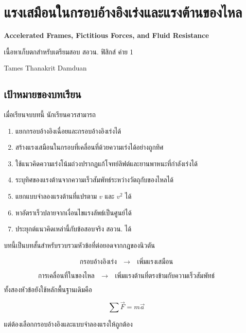 
\chapter{แรงเสมือนในกรอบอ้างอิงเร่งและแรงต้านของไหล}

\begin{center}
    {\Large\bfseries Accelerated Frames, Fictitious Forces, and Fluid Resistance}

    \vspace{0.5em}

    {\large เนื้อหาเก็บตกสำหรับเตรียมสอบ สอวน. ฟิสิกส์ ค่าย 1}

    \vspace{1em}

    Tames Thanakrit Damduan
\end{center}

\vspace{1em}

\section*{เป้าหมายของบทเรียน}

เมื่อเรียนจบบทนี้ นักเรียนควรสามารถ

\begin{enumerate}
    \item แยกกรอบอ้างอิงเฉื่อยและกรอบอ้างอิงเร่งได้
    \item สร้างแรงเสมือนในกรอบที่เคลื่อนที่ด้วยความเร่งได้อย่างถูกทิศ
    \item ใช้แนวคิดความเร่งโน้มถ่วงปรากฏแก้โจทย์ลิฟต์และยานพาหนะที่กำลังเร่งได้
    \item ระบุทิศของแรงต้านจากความเร็วสัมพัทธ์ระหว่างวัตถุกับของไหลได้
    \item แยกแบบจำลองแรงต้านที่แปรตาม $v$ และ $v^2$ ได้
    \item หาอัตราเร็วปลายจากเงื่อนไขแรงลัพธ์เป็นศูนย์ได้
    \item ประยุกต์แนวคิดเหล่านี้กับข้อสอบจริง สอวน. ได้
\end{enumerate}

\begin{tcolorbox}[title=ภาพรวมของบท]
บทนี้เป็นบทสั้นสำหรับรวบรวมหัวข้อที่ต่อยอดจากกฎของนิวตัน

\[
\boxed{\text{กรอบอ้างอิงเร่ง}
\quad \longrightarrow \quad
\text{เพิ่มแรงเสมือน}}
\]

\[
\boxed{\text{การเคลื่อนที่ในของไหล}
\quad \longrightarrow \quad
\text{เพิ่มแรงต้านที่ตรงข้ามกับความเร็วสัมพัทธ์}}
\]

ทั้งสองหัวข้อยังใช้หลักพื้นฐานเดิมคือ

\[
\sum \vec F=m\vec a
\]

แต่ต้องเลือกกรอบอ้างอิงและแบบจำลองแรงให้ถูกต้อง
\end{tcolorbox}

